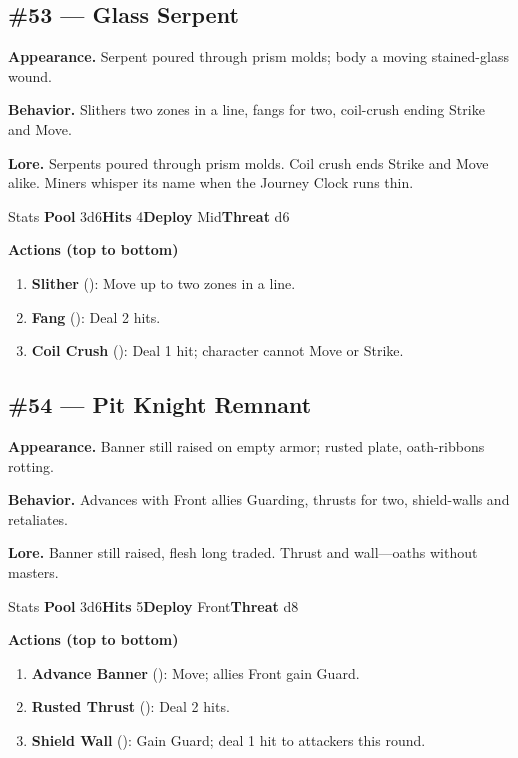 \subsection*{\#53 --- Glass Serpent}

\textbf{Appearance.} Serpent poured through prism molds; body a moving stained-glass wound.

\textbf{Behavior.} Slithers two zones in a line, fangs for two, coil-crush ending Strike and Move.

\textbf{Lore.} Serpents poured through prism molds. Coil crush ends Strike and Move alike. Miners whisper its name when the Journey Clock runs thin.

\begin{monsterentry}{Stats}
\textbf{Pool} 3d6\quad\textbf{Hits} 4\quad\textbf{Deploy} Mid\quad\textbf{Threat} d6

\textbf{Actions (top to bottom)}
\begin{enumerate}\setlength{\itemsep}{0.15em}\setlength{\parskip}{0pt}
  \item \textbf{Slither} (\easy): Move up to two zones in a line.
  \item \textbf{Fang} (\medium): Deal 2 hits.
  \item \textbf{Coil Crush} (\hard): Deal 1 hit; character cannot Move or Strike.
\end{enumerate}
\end{monsterentry}

\subsection*{\#54 --- Pit Knight Remnant}

\textbf{Appearance.} Banner still raised on empty armor; rusted plate, oath-ribbons rotting.

\textbf{Behavior.} Advances with Front allies Guarding, thrusts for two, shield-walls and retaliates.

\textbf{Lore.} Banner still raised, flesh long traded. Thrust and wall---oaths without masters.

\begin{monsterentry}{Stats}
\textbf{Pool} 3d6\quad\textbf{Hits} 5\quad\textbf{Deploy} Front\quad\textbf{Threat} d8

\textbf{Actions (top to bottom)}
\begin{enumerate}\setlength{\itemsep}{0.15em}\setlength{\parskip}{0pt}
  \item \textbf{Advance Banner} (\easy): Move; allies Front gain Guard.
  \item \textbf{Rusted Thrust} (\medium): Deal 2 hits.
  \item \textbf{Shield Wall} (\hard): Gain Guard; deal 1 hit to attackers this round.
\end{enumerate}
\end{monsterentry}

